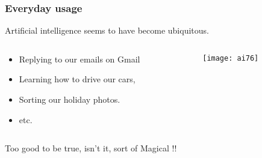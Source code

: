 




\begin{frame}[fragile]\frametitle{Everyday usage}
Artificial intelligence seems to have become ubiquitous.

\begin{columns}
    \begin{column}[T]{0.6\linewidth}

\begin{itemize}
\item Replying to our emails on Gmail
\item Learning how to drive our cars,
\item Sorting our holiday photos.
\item etc.
\end{itemize}

    \end{column}
    \begin{column}[T]{0.4\linewidth}

			\begin{center}
			\texttt{[image: ai76]}
			\end{center}
			
    \end{column}
  \end{columns}
  
  
  

Too good to be true, isn't it, sort of Magical !!
\end{frame}

